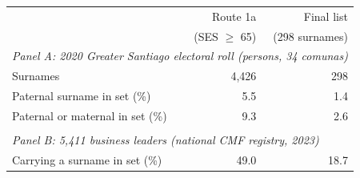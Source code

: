 \begin{tabular}{lrr}
\toprule
 & Route 1a & Final list \\
 & (SES $\geq$ 65) & (298 surnames) \\
\midrule
\multicolumn{3}{l}{\textit{Panel A: 2020 Greater Santiago electoral roll (persons, 34 comunas)}} \\
Surnames & 4,426 & 298 \\
Paternal surname in set (\%) & 5.5 & 1.4 \\
Paternal or maternal in set (\%) & 9.3 & 2.6 \\
\\[0.3em]
\multicolumn{3}{l}{\textit{Panel B: 5,411 business leaders (national CMF registry, 2023)}} \\
Carrying a surname in set (\%) & 49.0 & 18.7 \\
\bottomrule
\end{tabular}
